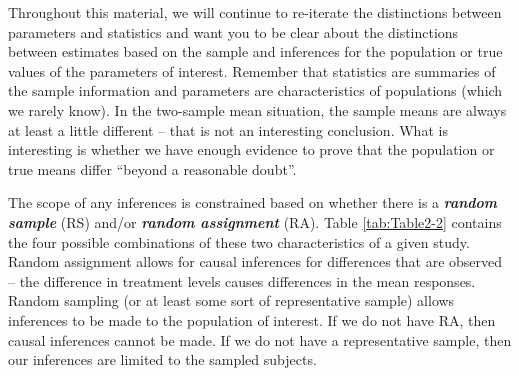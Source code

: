 \documentclass[]{book}
\theoremstyle{definition}
\theoremstyle{definition}
\theoremstyle{remark}
\begin{document}
Throughout this material, we will continue to re-iterate the
distinctions between parameters and statistics and want you to be clear
about the distinctions between estimates based on the sample and
inferences for the population or true values of the parameters of
interest. Remember that statistics are summaries of the sample
information and parameters are characteristics of populations (which we
rarely know). In the two-sample mean situation, the sample means are
always at least a little different -- that is not an interesting
conclusion. What is interesting is whether we have enough evidence to
prove that the population or true means differ ``beyond a reasonable
doubt''.

The scope of any inferences is constrained based on whether there is a
\textbf{\emph{random sample}} (RS) and/or \textbf{\emph{random
assignment}} (RA). Table \ref{tab:Table2-2} contains the four possible
combinations of these two characteristics of a given study. Random
assignment allows for causal inferences for differences that are
observed -- the difference in treatment levels causes differences in the
mean responses. Random sampling (or at least some sort of representative
sample) allows inferences to be made to the population of interest. If
we do not have RA, then causal inferences cannot be made. If we do not
have a representative sample, then our inferences are limited to the
sampled subjects.

\footnotesize
\end{document}
